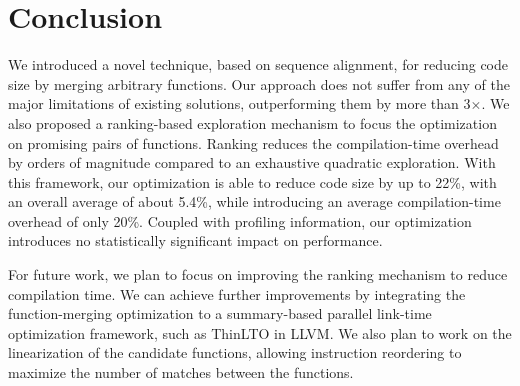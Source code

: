 \section{Conclusion}

We introduced a novel technique, based on sequence alignment, for reducing
code size by merging arbitrary functions. Our approach does not suffer from
any of the major limitations of existing solutions, outperforming them by more
than 3$\times$. We also proposed a ranking-based
exploration mechanism to focus the optimization on promising pairs of
functions. Ranking reduces the compilation-time overhead by orders of magnitude
compared to an exhaustive quadratic exploration. With this framework, our
optimization is able to reduce code size by up to 22\%, with an overall average
of about 5.4\%, while introducing an average compilation-time overhead of only 20\%.
Coupled with profiling information, our optimization introduces no statistically
significant impact on performance.

For future work, we plan to focus on improving the ranking mechanism to reduce
compilation time.
We can achieve further improvements by integrating the
function-merging optimization to a summary-based parallel link-time optimization
framework, such as ThinLTO in LLVM.
We also plan to work on the linearization of the candidate functions, allowing
instruction reordering to maximize the number of matches between the functions.
